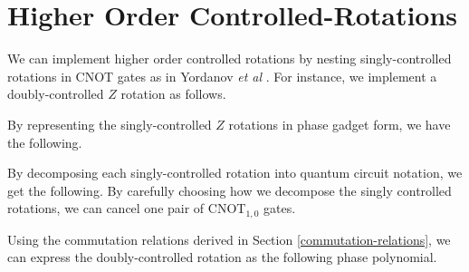 \section{Higher Order Controlled-Rotations}

We can implement higher order controlled rotations by nesting singly-controlled rotations in CNOT gates as in Yordanov \textit{et al} \cite{Yordanov2020}. For instance, we implement a doubly-controlled $Z$ rotation as follows.


By representing the singly-controlled $Z$ rotations in phase gadget form, we have the following.


By decomposing each singly-controlled rotation into quantum circuit notation, we get the following. By carefully choosing how we decompose the singly controlled rotations, we can cancel one pair of CNOT$_{1, 0}$ gates.


Using the commutation relations derived in Section \ref{commutation-relations}, we can express the doubly-controlled rotation as the following phase polynomial.


